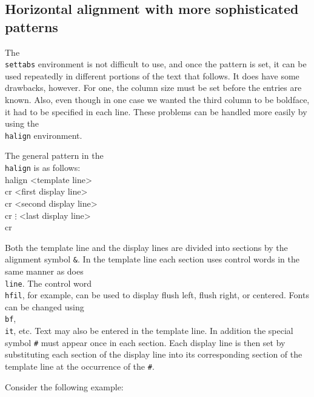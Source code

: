 \subsection{Horizontal alignment with more sophisticated patterns} 

The {\tt \\settabs} environment is not difficult to use, and once 
the pattern is set, it can be used repeatedly in different 
portions of the text that follows.  It does have some drawbacks, 
however. For one, the column size must be set before the entries 
are known. Also, even though in one case we wanted the third 
column to be boldface, it had to be specified in each line. 
These problems can be handled more easily by using the {\tt 
\\halign} environment. 


The general pattern in the {\tt \\halign} is as follows: 
\beginuser 
\\halign\lb{} <template line> \\cr 
<first display line> \\cr 
<second display line> \\cr 
$\vdots$ 
<last display line> \\cr 
\rb 
\enduser 

Both the template line and the display lines are divided into 
sections by the alignment symbol {\tt \&}\null. In the template 
line each section uses control words in the same manner as does 
{\tt \\line\lb\rb}\null.  The control word {\tt \\hfil}, for 
example, can be used to display flush left, flush right, or centered. 
Fonts can be changed using {\tt \\bf}, {\tt \\it}, etc. 
Text may also be entered in the template line.  In addition the 
special symbol {\tt \#} must appear once in each section.  Each 
display line is then set by substituting each section of the 
display line into its corresponding section of the template line 
at the occurrence of the {\tt \#}\null. 

Consider the following example: 

